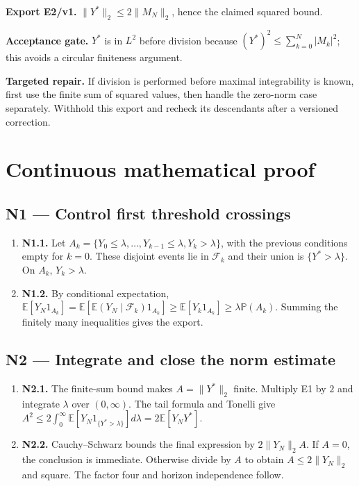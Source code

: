 \documentclass[preprint,12pt,aps,pra,showkeys,amsmath,amssymb,superscriptaddress,floatfix]{revtex4-2}
\theoremstyle{definition}
\theoremstyle{remark}
\newcommand{\field}[2]{\par\smallskip\noindent\textbf{#1.} #2\par}
\begin{document}
\field{Export E2/v1}{\(\|Y^*\|_2\le2\|M_N\|_2\), hence the claimed squared bound.}

\field{Acceptance gate}{\(Y^*\) is in \(L^2\) before division because
\((Y^*)^2\le\sum_{k=0}^N|M_k|^2\); this avoids a circular finiteness
argument.}

\field{Targeted repair}{If division is performed before maximal integrability is known, first
use the finite sum of squared values, then handle the zero-norm case
separately. Withhold this export and recheck its descendants after a
versioned correction.}

\endgroup\clearpage\section{Continuous mathematical proof}\label{sec:proof}

\subsection{N1 --- Control first threshold
crossings}\label{n1-control-first-threshold-crossings}

\begin{enumerate}
\def\labelenumi{\arabic{enumi}.}
\item
  \textbf{N1.1.} Let
  \(A_k=\{Y_0\le\lambda,\ldots,Y_{k-1}\le\lambda,Y_k>\lambda\}\), with
  the previous conditions empty for \(k=0\). These disjoint events lie
  in \(\mathcal F_k\) and their union is \(\{Y^*>\lambda\}\). On
  \(A_k\), \(Y_k>\lambda\).
\item
  \textbf{N1.2.} By conditional expectation,
  \(\mathbb E[Y_N1_{A_k}]=\mathbb E[\mathbb E(Y_N\mid\mathcal F_k)1_{A_k}]\ge\mathbb E[Y_k1_{A_k}]\ge\lambda\mathbb P(A_k)\).
  Summing the finitely many inequalities gives the export.
\end{enumerate}

\subsection{N2 --- Integrate and close the norm
estimate}\label{n2-integrate-and-close-the-norm-estimate}

\begin{enumerate}
\def\labelenumi{\arabic{enumi}.}
\item
  \textbf{N2.1.} The finite-sum bound makes \(A=\|Y^*\|_2\) finite.
  Multiply E1 by \(2\) and integrate \(\lambda\) over \((0,\infty)\).
  The tail formula and Tonelli give
  \(A^2\le2\int_0^\infty\mathbb E[Y_N1_{\{Y^*>\lambda\}}]d\lambda=2\mathbb E[Y_NY^*]\).
\item
  \textbf{N2.2.} Cauchy--Schwarz bounds the final expression by
  \(2\|Y_N\|_2 A\). If \(A=0\), the conclusion is immediate. Otherwise
  divide by \(A\) to obtain \(A\le2\|Y_N\|_2\) and square. The factor
  four and horizon independence follow.
\end{enumerate}
\end{document}
